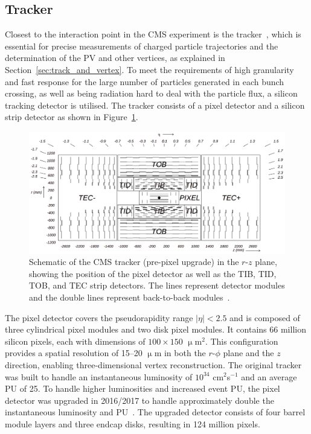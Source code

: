 \subsection{Tracker}

Closest to the interaction point in the \ac{CMS} experiment is the tracker~\cite{CMS_Setup,Malberti:2014pda,CMS:2012sda}, which is essential for precise measurements of charged particle trajectories and the determination of the \ac{PV} and other vertices, as explained in Section~\ref{sec:track_and_vertex}. 
To meet the requirements of high granularity and fast response for the large number of particles generated in each bunch crossing, as well as being radiation hard to deal with the particle flux, a silicon tracking detector is utilised. 
The tracker consists of a pixel detector and a silicon strip detector as shown in Figure~\ref{fig:tracker}. \\

\begin{figure}[!hbtp]
    \centering
    \includegraphics[width=\textwidth]{Figures/tracker.png}
    \caption{Schematic of the CMS tracker (pre-pixel upgrade) in the $r$-$z$ plane, showing the position of the pixel detector as well as the TIB, TID, TOB, and TEC strip detectors. The lines represent detector modules and the double lines represent back-to-back modules~\cite{CMS_Setup}.}
    \label{fig:tracker}
\end{figure}

The pixel detector covers the pseudorapidity range $|\eta| < 2.5$ and is composed of three cylindrical pixel modules and two disk pixel modules. 
It contains 66 million silicon pixels, each with dimensions of $100 \times 150$ $\upmu$m${^2}$. 
This configuration provides a spatial resolution of 15--20 $\upmu$m in both the $r$-$\phi$ plane and the $z$ direction, enabling three-dimensional vertex reconstruction.
The original tracker was built to handle an instantaneous luminosity of $10^{34}$ cm$^{2}$s$^{-1}$ and an average \ac{PU} of 25.
To handle higher luminosities and increased event \ac{PU}, the pixel detector was upgraded in 2016/2017 to handle approximately double the instantaneous luminosity and \ac{PU}~\cite{CMS:2012sda}. 
The upgraded detector consists of four barrel module layers and three endcap disks, resulting in 124 million pixels. \\

